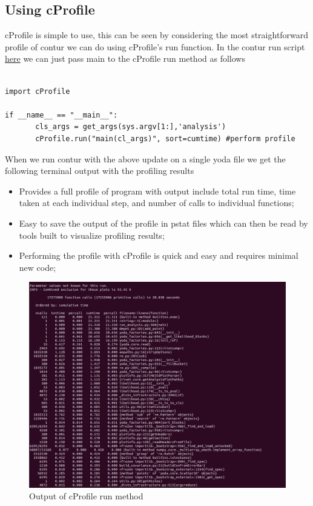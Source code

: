 \subsection{Using cProfile}
cProfile is simple to use, this can be seen by considering the most straightforward profile of contur we can do using cProfile's run function. In the contur run script \href{https://gitlab.com/hepcedar/contur/-/blob/master/bin/contur}{here} we can just pass main to the cProfile run method as follows 

\begin{verbatim}

import cProfile

if __name__ == "__main__":
       cls_args = get_args(sys.argv[1:],'analysis')
       cProfile.run("main(cl_args)", sort=cumtime) #perform profile
\end{verbatim}

When we run contur with the above update on a single yoda file we get the following terminal output with the profiling results

\begin{itemize}
\item Provides a full profile of program with output include total run time, time taken at each individual step, and number of calls to individual functions;
\item Easy to save the output of the profile in pstat files which can then be read by tools built to visualize profiling results;
\item Performing the profile with cProfile is quick and easy and requires minimal new code;
\end{itemize}

\begin{figure}[H]
\centering
\includegraphics[scale=0.35]{plots/example_profile.png}
\caption{Output of cProfile run method}
\label{fig:ep}
\end{figure}

